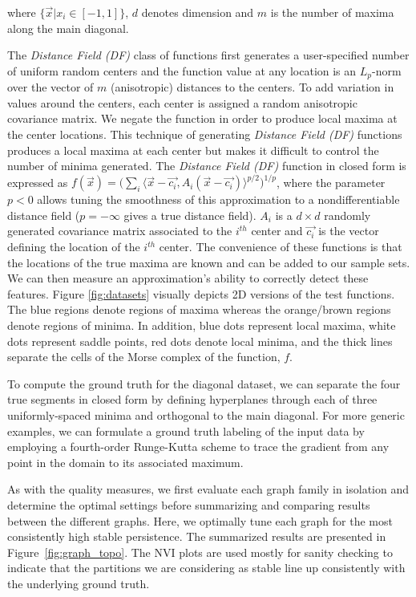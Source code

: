 where $\{\vec{x}|x_i\in [-1,1]\}$, $d$ denotes dimension and $m$ is the number of maxima along the main diagonal.

The \emph{Distance Field (DF)} class of functions first generates a user-specified number of uniform random centers and the function value at any location is an $L_p$-norm over the vector of $m$ (anisotropic) distances to the centers.
%
To add variation in values around the centers, each center is assigned a random anisotropic covariance matrix.
%
We negate the function in order to produce local maxima at the center locations.
%
This technique of generating \emph{Distance Field (DF)} functions produces a local maxima at each center but makes it difficult to control the number of minima generated.
%
The \emph{Distance Field (DF)} function in closed form is expressed as $f(\vec{x}) = \bigl(\sum_i \langle\vec{x}-\vec{c_i},A_i(\vec{x}-\vec{c_i})\rangle^{p/2}\bigr)^{1/p}$, where the parameter $p < 0$ allows tuning the smoothness of this approximation to a nondifferentiable distance field ($p = -\infty$ gives a true distance field).
%
$A_i$ is a $d \times d$ randomly generated covariance matrix associated to the $i^{th}$ center and $\vec{c_i}$ is the vector defining the location of the $i^{th}$ center.
%
The convenience of these functions is that the locations of the true maxima are known and can be added to our sample sets.
%
We can then measure an approximation's ability to correctly detect these features.
%
Figure \ref{fig:datasets} visually depicts 2D versions of the test functions.
%
The blue regions denote regions of maxima whereas the orange/brown regions denote regions of minima.
In addition, blue dots represent local maxima, white dots represent saddle points, red dots denote local minima, and the thick lines separate the cells
of the Morse complex of the function, $f$.

To compute the ground truth for the diagonal dataset, we can separate the four true segments in closed form by defining hyperplanes through each of three uniformly-spaced minima and orthogonal to the main diagonal.
%
For more generic examples, we can formulate a ground truth labeling of the input data by employing a fourth-order Runge-Kutta scheme to trace the gradient from any point in the domain to its associated maximum.

As with the quality measures, we first evaluate each graph family in isolation and determine the optimal settings before summarizing and comparing results between the different graphs.
%
Here, we optimally tune each graph for the most consistently high stable
persistence.
%
The summarized results are presented in Figure~\ref{fig:graph_topo}.
%
The NVI plots are used mostly for sanity checking to indicate that the partitions we are considering as stable line up consistently with the underlying ground truth.

